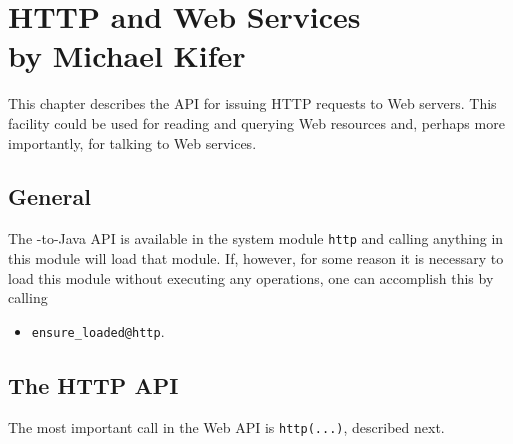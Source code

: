 \chapter[HTTP and Web Services]
{HTTP and Web Services\\
  {\Large by Michael Kifer}}


This chapter describes the API for issuing HTTP requests to Web servers.
This facility could be used for reading and querying Web resources and,
perhaps more importantly, for talking to Web services.

\section{General}

The \ERGO-to-Java API is available in the system module \texttt{\bs{}http}
and calling anything in this module will load that module. If, however, for
some reason it is necessary to load this module without executing any
operations, one can accomplish this by calling 
\begin{itemize}
\item  \texttt{ensure\_loaded@\bs{}http}. 
\end{itemize}

\section{The HTTP API}

The most important call in the \ERGO Web API is \texttt{http(...)},
described next. 

